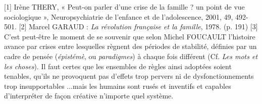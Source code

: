 [1] Irène THERY, « Peut-on parler d'une crise de la famille ? un point de vue sociologique », Neuropsychiatrie de l'enfance et de l'adolescence, 2001, 49, 492-501.
[2] Marcel GARAUD : \emph{La révolution française et la famille}, 1978. (p. 191)
[3] C'est peut-être le moment de se souvenir que selon Michel FOUCAULT l'histoire avance par crises entre lesquelles règnent des périodes de stabilité, définies par un cadre de pensée (\emph{épistémè}, ou \emph{paradigmes}) à chaque fois différent (Cf. \emph{Les mots et les choses}). Il faut certes que les ensembles de règles ainsi adoptées soient tenables, qu'ils ne provoquent pas d'effets trop pervers ni de dysfonctionnements trop insupportables ...mais les humains sont rusés et inventifs et capables d'interpréter de façon créative n'importe quel système.